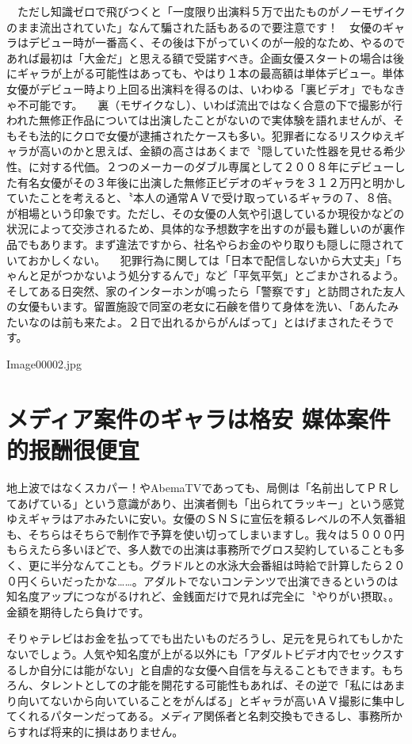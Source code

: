 \documentclass[12pt,UTF8]{ctexbook}
\begin{document}
　ただし知識ゼロで飛びつくと「一度限り出演料５万で出たものがノーモザイクのまま流出されていた」なんて騙された話もあるので要注意です！　女優のギャラはデビュー時が一番高く、その後は下がっていくのが一般的なため、やるのであれば最初は「大金だ」と思える額で受諾すべき。企画女優スタートの場合は後にギャラが上がる可能性はあっても、やはり１本の最高額は単体デビュー。単体女優がデビュー時より上回る出演料を得るのは、いわゆる「裏ビデオ」でもなきゃ不可能です。
　裏（モザイクなし）、いわば流出ではなく合意の下で撮影が行われた無修正作品については出演したことがないので実体験を語れませんが、そもそも法的にクロで女優が逮捕されたケースも多い。犯罪者になるリスクゆえギャラが高いのかと思えば、金額の高さはあくまで〝隠していた性器を見せる希少性〟に対する代価。２つのメーカーのダブル専属として２００８年にデビューした有名女優がその３年後に出演した無修正ビデオのギャラを３１２万円と明かしていたことを考えると、〝本人の通常ＡＶで受け取っているギャラの７、８倍〟が相場という印象です。ただし、その女優の人気や引退しているか現役かなどの状況によって交渉されるため、具体的な予想数字を出すのが最も難しいのが裏作品でもあります。まず違法ですから、社名やらお金のやり取りも隠しに隠されていておかしくない。
　犯罪行為に関しては「日本で配信しないから大丈夫」「ちゃんと足がつかないよう処分するんで」など「平気平気」とごまかされるよう。そしてある日突然、家のインターホンが鳴ったら「警察です」と訪問された友人の女優もいます。留置施設で同室の老女に石鹸を借りて身体を洗い、「あんたみたいなのは前も来たよ。２日で出れるからがんばって」とはげまされたそうです。

Image00002.jpg

\section{メディア案件のギャラは格安
媒体案件的报酬很便宜}

地上波ではなくスカパー！やAbemaTVであっても、局側は「名前出してＰＲしてあげている」という意識があり、出演者側も「出られてラッキー」という感覚ゆえギャラはアホみたいに安い。女優のＳＮＳに宣伝を頼るレベルの不人気番組も、そちらはそちらで制作で予算を使い切ってしまいますし。我々は５０００円もらえたら多いほどで、多人数での出演は事務所でグロス契約していることも多く、更に半分なんてことも。グラドルとの水泳大会番組は時給で計算したら２００円くらいだったかな……。アダルトでないコンテンツで出演できるというのは知名度アップにつながるけれど、金銭面だけで見れば完全に〝やりがい摂取〟。金額を期待したら負けです。

そりゃテレビはお金を払ってでも出たいものだろうし、足元を見られてもしかたないでしょう。人気や知名度が上がる以外にも「アダルトビデオ内でセックスするしか自分には能がない」と自虐的な女優へ自信を与えることもできます。もちろん、タレントとしての才能を開花する可能性もあれば、その逆で「私にはあまり向いてないから向いていることをがんばる」とギャラが高いＡＶ撮影に集中してくれるパターンだってある。メディア関係者と名刺交換もできるし、事務所からすれば将来的に損はありません。
\end{document}
